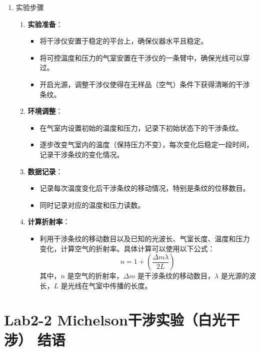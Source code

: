 \documentclass[dvipsnames, svgnames,a4paper,11pt]{article}
\begin{document}
\begin{enumerate}
\begin{enumerate}
			\item 实验步骤
			\begin{enumerate}
				\item \textbf{实验准备}：
				\begin{itemize}
					\item 将干涉仪安置于稳定的平台上，确保仪器水平且稳定。
					\item 将可控温度和压力的气室安置在干涉仪的一条臂中，确保光线可以穿过。
					\item 开启光源，调整干涉仪使得在无样品（空气）条件下获得清晰的干涉条纹。
				\end{itemize}
				
				\item \textbf{环境调整}：
				\begin{itemize}
					\item 在气室内设置初始的温度和压力，记录下初始状态下的干涉条纹。
					\item 逐步改变气室内的温度（保持压力不变），每次变化后稳定一段时间，记录干涉条纹的变化情况。
				\end{itemize}
				
				\item \textbf{数据记录}：
				\begin{itemize}
					\item 记录每次温度变化后干涉条纹的移动情况，特别是条纹的位移数目。
					\item 同时记录对应的温度和压力读数。
				\end{itemize}
				
				\item \textbf{计算折射率}：
				\begin{itemize}
					\item 利用干涉条纹的移动数目以及已知的光波长、气室长度、温度和压力变化，计算空气的折射率。具体计算可以使用以下公式：
					\[ n = 1 + \left(\frac{\Delta m \lambda}{2L}\right) \]
					其中，\(n\) 是空气的折射率，\(\Delta m\) 是干涉条纹的移动数目，\(\lambda\) 是光源的波长，\(L\) 是光线在气室中传播的长度。
				\end{itemize}
			\end{enumerate}
		\end{enumerate}		
	\end{enumerate}
	
	
	
	
	\clearpage
	
	\section{Lab2-2 Michelson干涉实验（白光干涉） \quad\heiti 结语}
	
\end{document}
